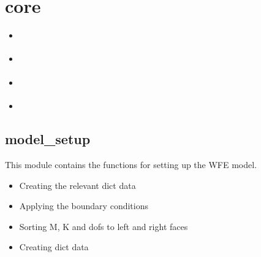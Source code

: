 \documentclass[letterpaper,10pt,english]{sphinxmanual}
\begin{document}
\section{core}
\label{\detokenize{core:core}}\label{\detokenize{core::doc}}
\begin{sphinxShadowBox}
\begin{itemize}
\item {} 
\sphinxAtStartPar
{}\label{\detokenize{core:id1}}{\hyperref[\detokenize{core:model-setup}]{}}

\item {} 
\sphinxAtStartPar
{}\label{\detokenize{core:id2}}{\hyperref[\detokenize{core:eigensolvers}]{}}

\item {} 
\sphinxAtStartPar
{}\label{\detokenize{core:id3}}{\hyperref[\detokenize{core:classify-modes}]{}}

\item {} 
\sphinxAtStartPar
{}\label{\detokenize{core:id4}}{\hyperref[\detokenize{core:forced-problem}]{}}

\end{itemize}
\end{sphinxShadowBox}
\label{\detokenize{core:module-pywfe.core.model_setup}}

\subsection{model\_setup}
\label{\detokenize{core:model-setup}}
\sphinxAtStartPar
This module contains the functions for setting up the WFE model.
\begin{description}
\begin{itemize}
\item {} 
\sphinxAtStartPar
Creating the relevant  dict data

\item {} 
\sphinxAtStartPar
Applying the boundary conditions

\item {} 
\sphinxAtStartPar
Sorting M, K and dofs to left and right faces

\item {} 
\sphinxAtStartPar
Creating  dict data

\end{itemize}

\end{description}
\end{document}
